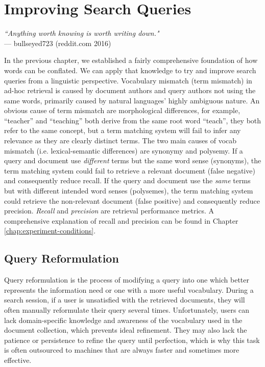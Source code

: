 \chapter{Improving Search Queries}
\begin{flushright}
    \textit{``Anything worth knowing is worth writing down."}
    \\ --- bullseyed723 (reddit.com 2016)
\end{flushright}




In the previous chapter, we established a fairly comprehensive foundation of how words can be conflated. We can apply that knowledge to try and improve search queries from a linguistic perspective. Vocabulary mismatch (term mismatch) in ad-hoc retrieval is caused by document authors and query authors not using the same words, primarily caused by natural languages' highly ambiguous nature. An obvious cause of term mismatch are morphological differences, for example, ``teacher'' and ``teaching'' both derive from the same root word ``teach'', they both refer to the same concept, but a term matching system will fail to infer any relevance as they are clearly distinct terms. The two main causes of vocab mismatch (i.e. lexical-semantic differences) are synonymy and polysemy. If a query and document use \textit{different} terms but the same word sense (synonyms), the term matching system could fail to retrieve a relevant document (false negative) and consequently reduce recall. If the query and document use the \textit{same} terms but with different intended word senses (polysemes), the term matching system could retrieve the non-relevant document (false positive) and consequently reduce precision. \textit{Recall} and \textit{precision} are retrieval performance metrics. A comprehensive explanation of recall and precision can be found in Chapter \ref{chap:experiment-conditions}.

\section{Query Reformulation}
Query reformulation is the process of modifying a query into one which better represents the information need or one with a more useful vocabulary. During a search session, if a user is unsatisfied with the retrieved documents, they will often manually reformulate their query several times. Unfortunately, users can lack domain-specific knowledge and awareness of the vocabulary used in the document collection, which prevents ideal refinement. They may also lack the patience or persistence to refine the query until perfection, which is why this task is often outsourced to machines that are always faster and sometimes more effective.

